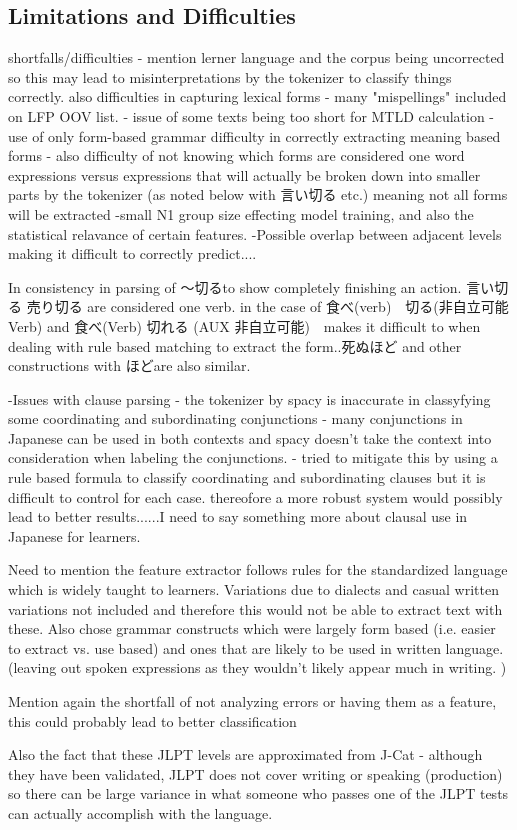 \subsection{Limitations and Difficulties}
shortfalls/difficulties
- mention lerner language and the corpus being uncorrected so this may lead to misinterpretations by the tokenizer to classify things correctly.
    also difficulties in capturing lexical forms - many "mispellings" included on LFP OOV list.
- issue of some texts being too short for MTLD calculation
- use of only form-based grammar difficulty in correctly extracting meaning based forms
- also difficulty of not knowing which forms are considered one word expressions versus expressions that will
actually be broken down into smaller parts by the tokenizer (as noted below with 言い切る etc.) meaning not all forms
will be extracted
-small N1 group size effecting model training, and also the statistical relavance of certain features.
-Possible overlap between adjacent levels making it difficult to correctly predict....

In consistency in parsing of 〜切るto show completely finishing an action. 言い切る 売り切る are considered one verb. in the
case of 食べ(verb)　切る(非自立可能Verb) and 食べ(Verb) 切れる (AUX 非自立可能)　makes it difficult to when dealing with rule based
matching to extract the form..死ぬほど and other constructions with ほどare also similar.

-Issues with clause parsing - the tokenizer by spacy is inaccurate in classyfying some coordinating and
subordinating conjunctions - many conjunctions in Japanese can be used in both contexts and spacy doesn't take the
context into consideration when labeling the conjunctions. - tried to mitigate this by using a rule based formula to
classify coordinating and subordinating clauses but it is difficult to control for each case. thereofore a more
robust system would possibly lead to better results......I need to say something more about clausal use in Japanese
for learners.


Need to mention the feature extractor follows rules for the standardized language which is widely taught to
learners. Variations due to dialects and casual written variations not included and therefore this would not be
able to extract text with these. Also chose grammar constructs which were largely form based (i.e. easier to extract
vs. use based) and ones that are likely to be used in written language. (leaving out spoken expressions as they
wouldn't likely appear much in writing. )

Mention again the shortfall of not analyzing errors or having them as a feature, this could probably lead to better
classification

Also the fact that these JLPT levels are approximated from J-Cat - although they have been validated, JLPT does not
cover writing or speaking (production) so there can be large variance in what someone who passes one of the JLPT
tests can actually accomplish with the language.